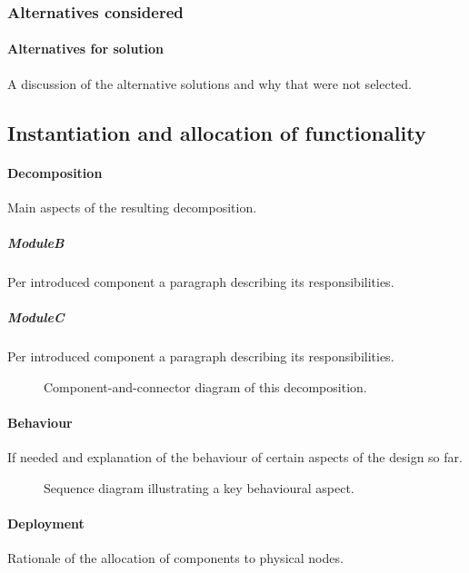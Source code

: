 \documentclass[english]{sareport}
\begin{document}
\subsubsection*{Alternatives considered}
\paragraph{Alternatives for solution}
A discussion of the alternative solutions and why that were not selected.

\subsection{Instantiation and allocation of functionality}
\paragraph{Decomposition}
Main aspects of the resulting decomposition.

\subparagraph{ModuleB}
Per introduced component a paragraph describing its responsibilities.

\subparagraph{ModuleC}
Per introduced component a paragraph describing its responsibilities.

\begin{figure}[!htp]
	\centering
	\caption{Component-and-connector diagram of this decomposition.
	}\label{fig:it1-cc_main}
\end{figure}

\paragraph{Behaviour}
If needed and explanation of the behaviour of certain aspects of the design so
far.

\begin{figure}[!htp]
	\centering
	\caption{Sequence diagram illustrating a key behavioural aspect.
	}\label{fig:it1-seq_aspect1}
\end{figure}

\paragraph{Deployment}
Rationale of the allocation of components to physical nodes.
\end{document}
